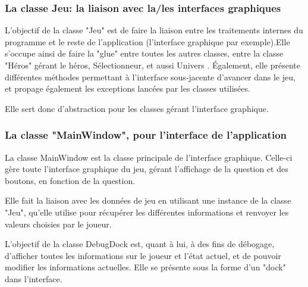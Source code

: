 \subsubsection{La classe Jeu: la liaison avec la/les interfaces graphiques}
L'objectif de la classe "Jeu" est de faire la liaison entre les traitements internes du programme et le reste de l'application (l'interface graphique par exemple).Elle s'occupe ainsi de faire la "glue" entre toutes les autres classes, entre la classe "Héros" gérant le héros, Sélectionneur, et aussi Univers . Également, elle présente  différentes méthodes permettant à l'interface sous-jacente d'avancer dans le jeu, et propage également les exceptions lancées par les classes utilisées.

Elle sert donc d'abstraction pour les classes gérant l'interface graphique.
\subsubsection{La classe "MainWindow", pour l'interface de l'application}
La classe MainWindow  est la classe principale de l'interface graphique. Celle-ci gère toute l'interface graphique du jeu, gérant l'affichage de la question et des boutons, en fonction de la question.

Elle fait la liaison avec les données de jeu en utilisant une instance de la classe "Jeu", qu'elle utilise pour récupérer les différentes informations et renvoyer les valeurs choisies par le joueur.


L'objectif de la classe DebugDock est, quant à lui, à des fins de débogage, d'afficher toutes les informations sur le joueur et l'état actuel, et de pouvoir modifier les informations actuelles. Elle se présente sous la forme d'un "dock" dans l'interface.